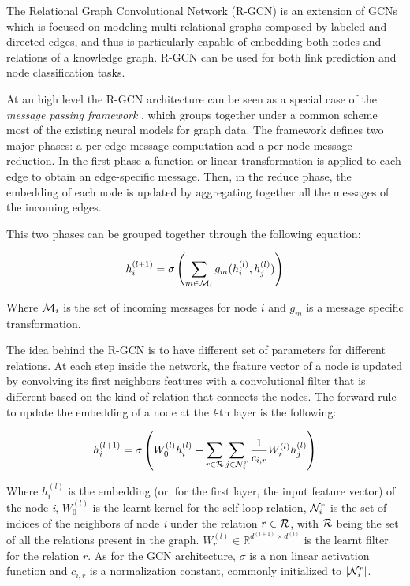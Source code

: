 \documentclass[%
    corpo=13.5pt,
    twoside,
    oldstyle,
    tipotesi=magistrale,
    greek,
    evenboxes
]{toptesi}
\begin{document}
The Relational Graph Convolutional Network \cite{schlichtkrull2018} (R-GCN) is an
extension of GCNs which is focused on modeling multi-relational graphs composed
by labeled and directed edges, and thus is particularly capable of embedding
both nodes and relations of a knowledge graph.
R-GCN can be used for both link prediction and node classification tasks.

At an high level the R-GCN architecture can be seen as a special case of
the \emph{message passing framework} \cite{gilmer2017}, which groups together
under a common scheme most of the existing neural models for graph data.
The framework defines two major phases: a per-edge message computation and a
per-node message reduction.
In the first phase a function or linear transformation is applied to each edge
to obtain an edge-specific message.
Then, in the reduce phase, the embedding of each node is updated by aggregating
together all the messages of the incoming edges.

This two phases can be grouped together through the following equation:

\begin{equation}
    h_i^{(l+1)} = \sigma \left(
            \sum_{m\in{\CMcal{M}_i}} g_m(h_i^{(l)}, h_j^{(l)})
        \right)
\end{equation}

Where $\CMcal{M}_i$ is the set of incoming messages for node $i$ and
$g_m$ is a message specific transformation.
\newline

The idea behind the R-GCN is to have different set of parameters
for different relations.
At each step inside the network, the feature vector of a node is updated by
convolving its first neighbors features with a convolutional filter that is
different based on the kind of relation that connects the nodes.
The forward
rule to update the embedding of a node at the \emph{l}-th layer is the following:

\begin{equation}
    h^{(l+1)}_{i} = \sigma \left(
        W_0^{(l)}h_i^{(l)} + \sum_{r\in\CMcal{R}}\sum_{j\in\CMcal{N}_i^r}
        \frac{1}{c_{i,r}} W_r^{(l)} h_j^{(l)}
    \right)
\end{equation}

Where $h_i^{(l)}$ is the embedding (or, for the first layer, the input feature
vector) of the node \emph{i}, $W_0^{(l)}$ is the learnt kernel for the
self loop relation, $\CMcal{N}_i^r$ is the
set of indices of the neighbors of node \emph{i} under the relation
$r\in\CMcal{R}$, with $\CMcal{R}$ being the set of all the relations present in
the graph. $W_r^{(l)}\in\mathbb{R}^{d^{(l+1)}\times d^{(l)}}$ is the learnt
filter for the relation $r$. As for the GCN architecture, $\sigma$ is a non
linear activation function and $c_{i,r}$ is a normalization constant, commonly
initialized to $|\CMcal{N}_i^r|$.
\end{document}
